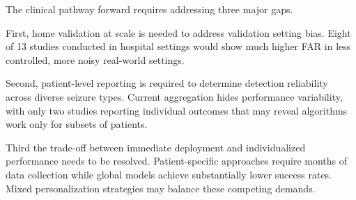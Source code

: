 The clinical pathway forward requires addressing three major gaps. 

First, home validation at scale is needed to address validation setting bias. Eight of 13 studies conducted in hospital settings would show much higher FAR in less controlled, more noisy real-world settings. 

Second, patient-level reporting is required to determine detection reliability across diverse seizure types. Current aggregation hides performance variability, with only two studies reporting individual outcomes that may reveal algorithms work only for subsets of patients. 

Third the trade-off between immediate deployment and individualized performance needs to be resolved. Patient-specific approaches require months of data collection while global models achieve substantially lower success rates. Mixed personalization strategies may balance these competing demands.
